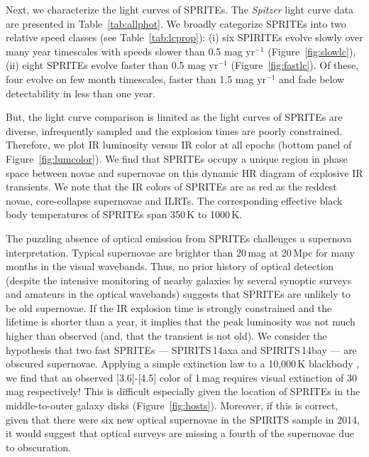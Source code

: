 \documentclass[twocolumn,times]{aastex6}
\begin{document}

Next, we characterize the light curves of SPRITEs. The {\it Spitzer} light curve data are presented in Table~\ref{tab:allphot}. 
We broadly categorize SPRITEs into two relative speed classes (see Table~\ref{tab:lcprop}): 
(i) six SPIRITEs evolve slowly over many year timescales with speeds slower than 0.5 mag yr$^{-1}$ (Figure~\ref{fig:slowlc}), 
(ii) eight SPRITEs evolve faster than 0.5 mag yr$^{-1}$ (Figure~\ref{fig:fastlc}). Of these, four evolve on few month timescales, 
faster than 1.5 mag yr$^{-1}$ and fade below detectability in less than one year. 

But, the light curve comparison is limited as the light curves of SPRITEs are diverse, infrequently sampled and the explosion times 
are poorly constrained. Therefore, we plot IR luminosity versus IR color at all epochs (bottom panel of Figure~\ref{fig:lumcolor}).  We find that 
SPRITEs occupy a unique region in phase space between novae and supernovae on this dynamic HR diagram of explosive IR transients. 
We note that the IR colors of SPRITEs are as red as the reddest novae, core-collapse supernovae and ILRTs. The corresponding effective 
black body temperatures of SPRITEs span 350\,K to 1000\,K. 

The puzzling absence of optical emission from SPRITEs challenges a supernova interpretation.
Typical supernovae are brighter than 20\,mag at 20\,Mpc for many months in the visual wavebands. Thus, no prior
history of optical detection (despite the intensive monitoring of nearby galaxies by several synoptic surveys and amateurs 
in the optical wavebands) suggests that SPRITEs are unlikely to be old supernovae. 
If the IR explosion time is strongly constrained and the lifetime is shorter than a year, it implies that the peak luminosity was not much higher 
than observed (and, that the transient is not old). We consider the hypothesis that two fast SPRITEs --- 
SPIRITS\,14axa and SPIRITS\,14bay ---  are obscured supernovae.  Applying a simple extinction law to a 
10,000\,K blackbody \citep{Cardelli1989, Chapman2009}, we find that an observed [3.6]-[4.5] color of 1\,mag requires 
visual extinction of 30\,mag respectively! This is difficult especially given the location of SPRITEs in the middle-to-outer 
galaxy disks (Figure~\ref{fig:hosts}). Moreover, if this is correct, given that there were six new optical supernovae in the SPIRITS 
sample in 2014, it would suggest that optical surveys are missing a fourth of the supernovae due to obscuration. 
\end{document}
